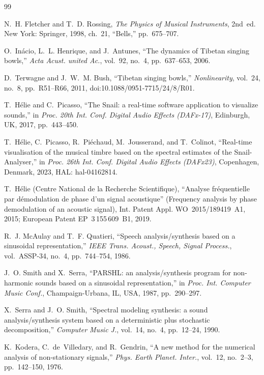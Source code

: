 \documentclass[10pt,a4paper,twocolumn]{article}
\begin{document}
\small
\begin{thebibliography}{99}
\setlength{\itemsep}{1pt}

N.~H. Fletcher and T.~D. Rossing, \emph{The Physics of Musical Instruments}, 2nd~ed. New York: Springer, 1998, ch.~21, ``Bells,'' pp.~675--707.

O.~Inácio, L.~L. Henrique, and J.~Antunes, ``The dynamics of Tibetan singing bowls,'' \emph{Acta Acust. united Ac.}, vol.~92, no.~4, pp.~637--653, 2006.

D.~Terwagne and J.~W.~M. Bush, ``Tibetan singing bowls,'' \emph{Nonlinearity}, vol.~24, no.~8, pp.~R51--R66, 2011, doi:10.1088/0951-7715/24/8/R01.

T.~Hélie and C.~Picasso, ``The Snail: a real-time software application to visualize sounds,'' in \emph{Proc. 20th Int. Conf. Digital Audio Effects (DAFx-17)}, Edinburgh, UK, 2017, pp.~443--450.

T.~Hélie, C.~Picasso, R.~Piéchaud, M.~Jousserand, and T.~Colinot, ``Real-time visualisation of the musical timbre based on the spectral estimates of the Snail-Analyser,'' in \emph{Proc. 26th Int. Conf. Digital Audio Effects (DAFx23)}, Copenhagen, Denmark, 2023, HAL: hal-04162814.

T.~Hélie (Centre National de la Recherche Scientifique), ``Analyse fréquentielle par démodulation de phase d'un signal acoustique'' (Frequency analysis by phase demodulation of an acoustic signal), Int. Patent Appl. WO~2015/189419~A1, 2015; European Patent EP~3\,155\,609~B1, 2019.

R.~J. McAulay and T.~F. Quatieri, ``Speech analysis/synthesis based on a sinusoidal representation,'' \emph{IEEE Trans. Acoust., Speech, Signal Process.}, vol.~ASSP-34, no.~4, pp.~744--754, 1986.

J.~O. Smith and X.~Serra, ``PARSHL: an analysis/synthesis program for non-harmonic sounds based on a sinusoidal representation,'' in \emph{Proc. Int. Computer Music Conf.}, Champaign-Urbana, IL, USA, 1987, pp.~290--297.

X.~Serra and J.~O. Smith, ``Spectral modeling synthesis: a sound analysis/synthesis system based on a deterministic plus stochastic decomposition,'' \emph{Computer Music J.}, vol.~14, no.~4, pp.~12--24, 1990.

K.~Kodera, C.~de~Villedary, and R.~Gendrin, ``A new method for the numerical analysis of non-stationary signals,'' \emph{Phys. Earth Planet. Inter.}, vol.~12, no.~2--3, pp.~142--150, 1976.


\end{thebibliography}
\end{document}
